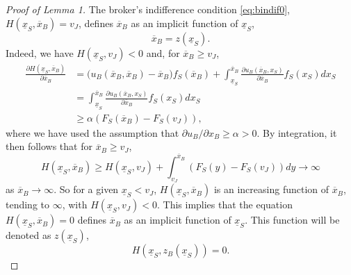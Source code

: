 \documentclass[11pt,twopage]{article}
\newcommand{\ol}{\overline}
\newcommand{\ul}{\underline}
\begin{document}
\begin{proof}[Proof of Lemma 1]
The broker's indifference condition \eqref{eq:bindif0}, $H(\underline x_S,\ol x_B) = v_J$, defines
$\ol x_B$ as an implicit function of $\underline x_S$, \[ \ol x_B=z(\underline x_S).\] Indeed, we have $H(\ul x_S,v_J)<0$ and, for $\ol x_B \geq v_J$,  \begin{align*}
\frac{\partial H(\underline x_S,\ol x_B)}{\partial
    \ol x_B} &= \Big(  u_B(\ol x_B,\ol x_B) - \ol x_B \Big)f_S(\ol x_B)+\int_{\ul x_S}^{\ol x_B} \frac{\partial u_B(\ol x_B,x_S)}{\partial \ol x_B} f_S(x_S) dx_S
 \\
 &=   \int_{\ul x_S}^{\ol x_B} \frac{\partial u_B(\ol x_B,x_S)}{\partial \ol x_B} f_S(x_S) dx_S
 \\
 &\geq \alpha (F_S(\ol x_B) - F_S(v_J)),
\end{align*}
where we have used the assumption that $\partial u_B/\partial x_B \geq \alpha >0$. By integration, it then follows that for $\ol x_B \geq v_J$,
\[ 
H(\ul x_S, \ol x_B) \geq H( \ul x_S,v_J) + \int_{v_J}^{\ol x_B} (F_S(y) - F_S(v_J))dy \to \infty 
\]
as $\ol x_B \to \infty$. So for a given $\ul x_S < v_J$, $H(\ul x_S,\ol x_B)$ is an increasing function of $\ol x_B$, tending to $\infty$, with $H(\ul x_S,v_J) < 0$. This implies that the equation $H(\ul x_S, \ol x_B) = 0$ defines $\ol x_B$ as an implicit function of $\ul x_S$. This function will be denoted as $z(\ul x_S)$,
\[ H( \ul x_S, z_B(\ul x_S)) = 0 . \]


\end{proof}
\end{document}
